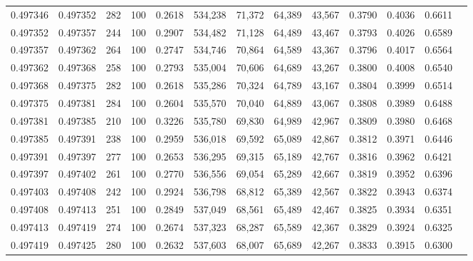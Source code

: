 \begin{tabular}{rrrrrrrrrrrrr}
0.497346 & 0.497352 &   282 & 100 &                                     0.2618 & 534,238 &  71,372 &  64,389 &  43,567 & 0.3790 & 0.4036 & 0.6611 \\
0.497352 & 0.497357 &   244 & 100 &                                     0.2907 & 534,482 &  71,128 &  64,489 &  43,467 & 0.3793 & 0.4026 & 0.6589 \\
0.497357 & 0.497362 &   264 & 100 &                                     0.2747 & 534,746 &  70,864 &  64,589 &  43,367 & 0.3796 & 0.4017 & 0.6564 \\
0.497362 & 0.497368 &   258 & 100 &                                     0.2793 & 535,004 &  70,606 &  64,689 &  43,267 & 0.3800 & 0.4008 & 0.6540 \\
0.497368 & 0.497375 &   282 & 100 &                                     0.2618 & 535,286 &  70,324 &  64,789 &  43,167 & 0.3804 & 0.3999 & 0.6514 \\
0.497375 & 0.497381 &   284 & 100 &                                     0.2604 & 535,570 &  70,040 &  64,889 &  43,067 & 0.3808 & 0.3989 & 0.6488 \\
0.497381 & 0.497385 &   210 & 100 &                                     0.3226 & 535,780 &  69,830 &  64,989 &  42,967 & 0.3809 & 0.3980 & 0.6468 \\
0.497385 & 0.497391 &   238 & 100 &                                     0.2959 & 536,018 &  69,592 &  65,089 &  42,867 & 0.3812 & 0.3971 & 0.6446 \\
0.497391 & 0.497397 &   277 & 100 &                                     0.2653 & 536,295 &  69,315 &  65,189 &  42,767 & 0.3816 & 0.3962 & 0.6421 \\
0.497397 & 0.497402 &   261 & 100 &                                     0.2770 & 536,556 &  69,054 &  65,289 &  42,667 & 0.3819 & 0.3952 & 0.6396 \\
0.497403 & 0.497408 &   242 & 100 &                                     0.2924 & 536,798 &  68,812 &  65,389 &  42,567 & 0.3822 & 0.3943 & 0.6374 \\
0.497408 & 0.497413 &   251 & 100 &                                     0.2849 & 537,049 &  68,561 &  65,489 &  42,467 & 0.3825 & 0.3934 & 0.6351 \\
0.497413 & 0.497419 &   274 & 100 &                                     0.2674 & 537,323 &  68,287 &  65,589 &  42,367 & 0.3829 & 0.3924 & 0.6325 \\
0.497419 & 0.497425 &   280 & 100 &                                     0.2632 & 537,603 &  68,007 &  65,689 &  42,267 & 0.3833 & 0.3915 & 0.6300 \\

\end{tabular}

